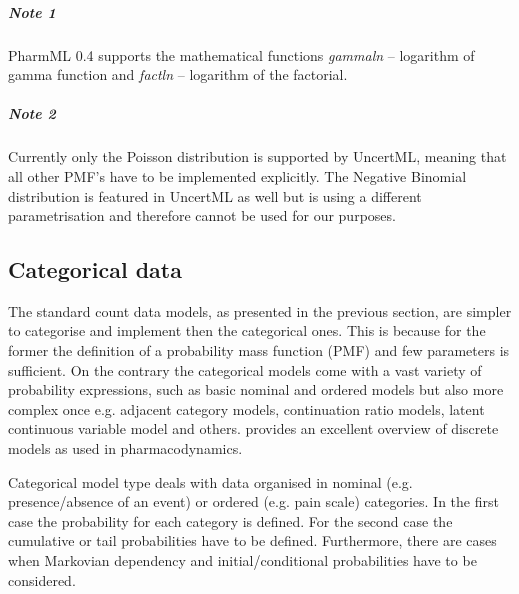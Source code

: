 \subparagraph{Note 1} PharmML 0.4 supports the mathematical functions \textit{gammaln} 
-- logarithm of gamma function and \textit{factln} -- logarithm of the factorial.
\subparagraph{Note 2} Currently only the Poisson distribution is supported by UncertML, 
meaning that all other PMF's have to be implemented explicitly. The Negative Binomial distribution
is featured in UncertML as well but is using a different parametrisation and therefore cannot be used 
for our purposes.

\subsection{Categorical data}
\label{subsec:mmCategoricalData}
The standard count data models, as presented in the previous section, are simpler to categorise 
and implement then the categorical ones. This is because for the former the definition of a probability 
mass function (PMF) and few parameters is sufficient. On the contrary the categorical models come 
with a vast variety of probability expressions, such as basic nominal and ordered models but also 
more complex once e.g. adjacent category models, continuation ratio 
models, latent continuous variable model and others. \cite{Paule:2012fk} provides an excellent 
overview of discrete models as used in pharmacodynamics.

Categorical model type deals with data organised in nominal (e.g. presence/absence of an event) 
or ordered (e.g. pain scale) categories. In the first case the probability for each category is defined. 
For the second case the cumulative or tail probabilities have to be defined. Furthermore, there are cases
when Markovian dependency and initial/conditional probabilities have to be considered.

